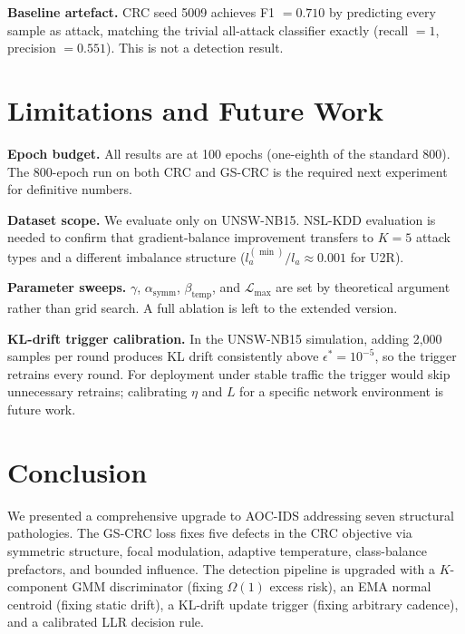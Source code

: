 \documentclass[conference]{IEEEtran}
\begin{document}
\noindent\textbf{Baseline artefact.}
CRC seed 5009 achieves F1 $= 0.710$ by predicting every sample as attack,
matching the trivial all-attack classifier exactly (recall $= 1$,
precision $= 0.551$). This is not a detection result.

\section{Limitations and Future Work}

\noindent\textbf{Epoch budget.}
All results are at 100 epochs (one-eighth of the standard 800).
The 800-epoch run on both CRC and GS-CRC is the required next experiment
for definitive numbers.

\noindent\textbf{Dataset scope.}
We evaluate only on UNSW-NB15. NSL-KDD evaluation is needed to confirm
that gradient-balance improvement transfers to $K=5$ attack types and
a different imbalance structure ($l_a^{(\min)}/l_a \approx 0.001$ for U2R).

\noindent\textbf{Parameter sweeps.}
$\gamma$, $\alpha_{\text{symm}}$, $\beta_{\text{temp}}$, and $\mathcal{L}_{\max}$
are set by theoretical argument rather than grid search. A full ablation
is left to the extended version.

\noindent\textbf{KL-drift trigger calibration.}
In the UNSW-NB15 simulation, adding 2,000 samples per round produces
KL drift consistently above $\epsilon^* = 10^{-5}$, so the trigger
retrains every round. For deployment under stable traffic the trigger
would skip unnecessary retrains; calibrating $\eta$ and $L$ for a specific
network environment is future work.

\section{Conclusion}

We presented a comprehensive upgrade to AOC-IDS addressing seven
structural pathologies. The GS-CRC loss fixes five defects in the CRC
objective via symmetric structure, focal modulation, adaptive temperature,
class-balance prefactors, and bounded influence. The detection pipeline
is upgraded with a $K$-component GMM discriminator (fixing $\Omega(1)$
excess risk), an EMA normal centroid (fixing static drift), a
KL-drift update trigger (fixing arbitrary cadence), and a calibrated
LLR decision rule.
\end{document}
